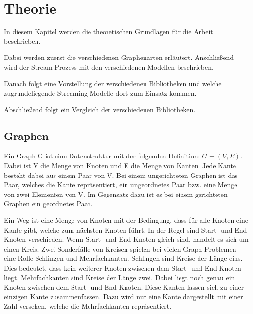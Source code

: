 \chapter{Theorie}
In diesem Kapitel werden die theoretischen Grundlagen für die Arbeit beschrieben.

Dabei werden zuerst die verschiedenen Graphenarten erläutert. Anschließend wird
der Stream-Prozess mit den verschiedenen Modellen beschrieben.

Danach folgt eine Vorstellung der verschiedenen Bibliotheken und welche
zugrundeliegende Streaming-Modelle dort zum Einsatz kommen.

Abschließend folgt ein Vergleich der verschiedenen Bibliotheken.

\section{Graphen}
Ein Graph G ist eine Datenstruktur mit der folgenden Definition: $G = (V,E)$.
Dabei ist V die Menge von Knoten und E die Menge von Kanten. Jede Kante besteht
dabei aus einem Paar von V. Bei einem ungerichteten Graphen ist das Paar, welches
die Kante repräsentiert, ein ungeordnetes Paar bzw. eine Menge von zwei
Elementen von V. Im Gegensatz dazu ist es bei einem gerichteten Graphen ein
geordnetes Paar.


Ein Weg ist eine Menge von Knoten mit der Bedingung, dass für alle Knoten eine
Kante gibt, welche zum nächsten Knoten führt. In der Regel sind Start- und
End-Knoten verschieden. Wenn Start- und End-Knoten gleich sind, handelt es sich
um einen Kreis. Zwei Sonderfälle von Kreisen spielen bei vielen Graph-Problemen
eine Rolle Schlingen und Mehrfachkanten. Schlingen sind Kreise der Länge eins.
Dies bedeutet, dass kein weiterer Knoten zwischen dem Start- und End-Knoten
liegt. Mehrfachkanten sind Kreise der Länge zwei. Dabei liegt noch genau ein
Knoten zwischen dem Start- und End-Knoten. Diese Kanten lassen sich zu einer
einzigen Kante zusammenfassen. Dazu wird nur eine Kante dargestellt mit einer
Zahl versehen, welche die Mehrfachkanten repräsentiert.

